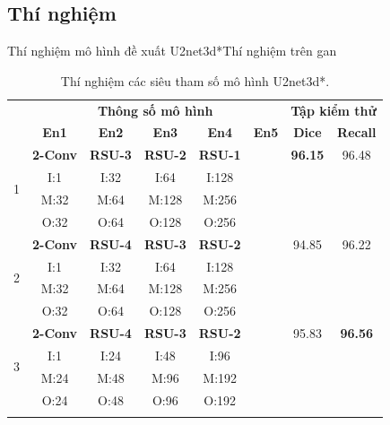 \documentclass[
	10pt,                %
	aspectratio=169,     %
]{beamer}
\begin{document}
\subsection{Thí nghiệm}
    \begin{frame}{Thí nghiệm mô hình đề xuất U2net3d*}{Thí nghiệm trên gan}
	\begin{table}[H]
        \centering
        \begin{tabular}{c|c c c c c | c c}
        \Xhline{3\arrayrulewidth}
            \multirow{2}{*}{\textbf{STT}} & \multicolumn{5}{c|}{\textbf{Thông số mô hình}} & \multicolumn{2}{c}{\textbf{Tập kiểm thử}} \\
            & \textbf{En1} & \textbf{En2} & \textbf{En3} & \textbf{En4} & \textbf{En5} & \textbf{Dice} & \textbf{Recall} \\ 
            \hline
            \multirow{4}{*}{1} & \textbf{2-Conv} & \textbf{RSU-3} & \textbf{RSU-2} & \textbf{RSU-1} &  & \textbf{96.15} & 96.48 \\
                                          & I:1  & I:32 & I:64 & I:128 & \\ 
                                          & M:32 & M:64 & M:128 & M:256 & \\
                                          & O:32 & O:64 & O:128 & O:256 & \\
            \hline
            \multirow{4}{*}{2} & \textbf{2-Conv} & \textbf{RSU-4} & \textbf{RSU-3} & \textbf{RSU-2} &  & 94.85 & 96.22 \\
                                          & I:1  & I:32 & I:64 & I:128 & \\ 
                                          & M:32 & M:64 & M:128 & M:256 & \\
                                          & O:32 & O:64 & O:128 & O:256 & \\
            \hline
            \multirow{4}{*}{3} & \textbf{2-Conv} & \textbf{RSU-4} & \textbf{RSU-3} & \textbf{RSU-2} &  & 95.83 & \textbf{96.56} \\
                                          & I:1  & I:24 & I:48 & I:96 & \\ 
                                          & M:24 & M:48 & M:96 & M:192 & \\
                                          & O:24 & O:48 & O:96 & O:192 & \\
            \hline
    
        \Xhline{3\arrayrulewidth}
        \end{tabular}
        \caption{Thí nghiệm các siêu tham số mô hình U2net3d*.}
    \end{table}
	\end{frame}
	
\end{document}
